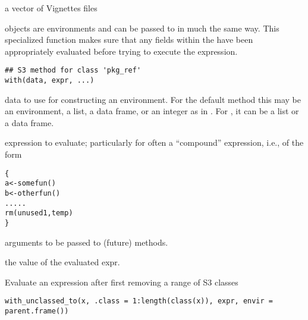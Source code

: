 \documentclass[a4paper]{book}
\begin{document}
%
\begin{Value}
a vector of Vignettes files
\end{Value}
%
\begin{Description}
 objects are environments and can be passed to 
in much the same way. This specialized function makes sure that any fields
within the  have been appropriately evaluated before trying
to execute the expression.
\end{Description}
%
\begin{Usage}
\begin{verbatim}
## S3 method for class 'pkg_ref'
with(data, expr, ...)
\end{verbatim}
\end{Usage}
%
\begin{Arguments}
\begin{ldescription}
\item[\code{data}] data to use for constructing an environment. For the
default  method this may be an environment, a list, a
data frame, or an integer as in . For ,
it can be a list or a data frame.

\item[\code{expr}] expression to evaluate; particularly for 
often a ``compound'' expression, i.e., of the form \begin{alltt}   \{
     a <- somefun()
     b <- otherfun()
     .....
     rm(unused1, temp)
   \}
\end{alltt}


\item[\code{...}] arguments to be passed to (future) methods.
\end{ldescription}
\end{Arguments}
%
\begin{Value}
the value of the evaluated expr.
\end{Value}
%
\begin{Description}
Evaluate an expression after first removing a range of S3 classes
\end{Description}
%
\begin{Usage}
\begin{verbatim}
with_unclassed_to(x, .class = 1:length(class(x)), expr, envir = parent.frame())
\end{verbatim}
\end{Usage}
\end{document}
